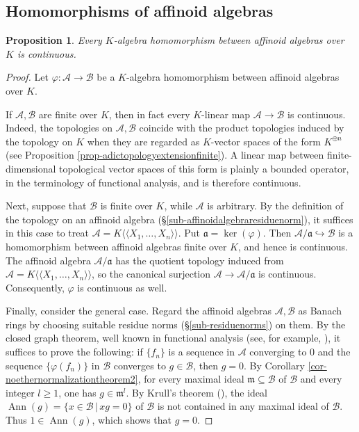 \documentclass[a4paper,12pt, dvipdfmx]{jsbook}
\def\ker{\mathop{\mathrm{ker}}\nolimits}
\def\Ann{\mathop{\mathrm{Ann}}\nolimits}
\def\dl{\langle\!\langle}
\def\dr{\rangle\!\rangle}
\theoremstyle{plain}
\newtheorem{prop}[thm]{\bfseries Proposition}
\theoremstyle{definition}
\begin{document}
\subsection{Homomorphisms of affinoid algebras}\label{sub-homomorphismsaffinoidalgebras}
\begin{prop}\label{prop-coraffinoidsmorphismcontinuous}{\rm 
Every $K$-algebra homomorphism between affinoid algebras over $K$ is continuous.}
\end{prop}

\begin{proof}[Proof]
Let $\varphi\colon\mathcal{A}\rightarrow\mathcal{B}$ be a $K$-algebra homomorphism between affinoid algebras over $K$.

If $\mathcal{A},\mathcal{B}$ are finite over $K$, then in fact every $K$-linear map $\mathcal{A}\rightarrow\mathcal{B}$ is continuous.
Indeed, the topologies on $\mathcal{A},\mathcal{B}$ coincide with the product topologies induced by the topology on $K$ when they are regarded as $K$-vector spaces of the form $K^{\oplus n}$ (see Proposition \ref{prop-adictopologyextensionfinite}). A linear map between finite-dimensional topological vector spaces of this form is plainly a bounded operator, in the terminology of functional analysis, and is therefore continuous.

Next, suppose that $\mathcal{B}$ is finite over $K$, while $\mathcal{A}$ is arbitrary.
By the definition of the topology on an affinoid algebra (\S\ref{sub-affinoidalgebraresiduenorm}), it suffices in this case to treat $\mathcal{A}=K\dl X_1,\ldots,X_n\dr$.
Put $\mathfrak{a}=\ker(\varphi)$. Then $\mathcal{A}/\mathfrak{a}\hookrightarrow\mathcal{B}$ is a homomorphism between affinoid algebras finite over $K$, and hence is continuous.
The affinoid algebra $\mathcal{A}/\mathfrak{a}$ has the quotient topology induced from $\mathcal{A}=K\dl X_1,\ldots,X_n\dr$, so the canonical surjection $\mathcal{A}\rightarrow\mathcal{A}/\mathfrak{a}$ is continuous. Consequently, $\varphi$ is continuous as well.

Finally, consider the general case.
Regard the affinoid algebras $\mathcal{A},\mathcal{B}$ as Banach rings by choosing suitable residue norms (\S\ref{sub-residuenorms}) on them.
By the closed graph theorem, well known in functional analysis (see, for example, \cite[\S2.8.1]{BGR}), it suffices to prove the following: if $\{f_n\}$ is a sequence in $\mathcal{A}$ converging to $0$ and the sequence $\{\varphi(f_n)\}$ in $\mathcal{B}$ converges to $g\in\mathcal{B}$, then $g=0$.
By Corollary \ref{cor-noethernormalizationtheorem2}, for every maximal ideal $\mathfrak{m}\subseteq\mathcal{B}$ of $\mathcal{B}$ and every integer $l\geq 1$, one has $g\in\mathfrak{m}^l$.
By Krull's theorem (\cite[Chap.\ III, \S3.2, Cor.]{Bourb1}), the ideal $\Ann(g)=\{x\in\mathcal{B}\,|\,xg=0\}$ of $\mathcal{B}$ is not contained in any maximal ideal of $\mathcal{B}$.
Thus $1\in\Ann(g)$, which shows that $g=0$.
\end{proof}
\end{document}
